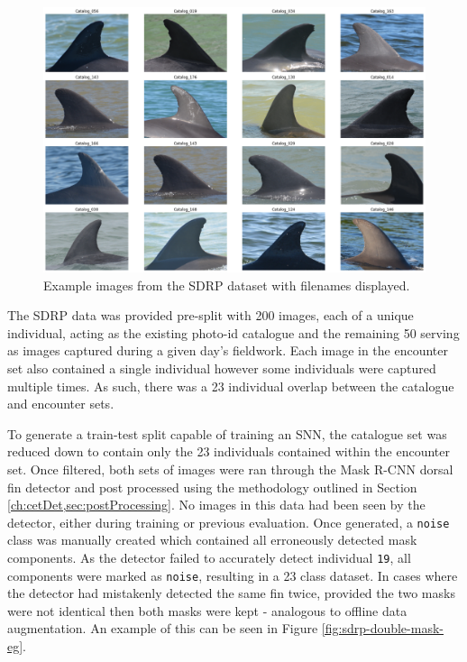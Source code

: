 \begin{figure}
	\begin{center}
		\includegraphics[scale=0.3]{Chapter6/figs/SDRP_egs_tiled.png}
	\end{center}
	\caption{Example images from the SDRP dataset with filenames displayed.}
	\label{fig:sdrp-example}
\end{figure}

The SDRP data was provided pre-split with 200 images, each of a unique individual, acting as the existing photo-id catalogue and the remaining 50 serving as images captured during a given day's fieldwork. Each image in the encounter set also contained a single individual however some individuals were captured multiple times. As such, there was a 23 individual overlap between the catalogue and encounter sets. 

To generate a train-test split capable of training an SNN, the catalogue set was reduced down to contain only the 23 individuals contained within the encounter set. Once filtered, both sets of images were ran through the Mask R-CNN dorsal fin detector and post processed using the methodology outlined in Section \ref{ch:cetDet,sec:postProcessing}. No images in this data had been seen by the detector, either during training or previous evaluation. Once generated, a \texttt{noise} class was manually created which contained all erroneously detected mask components. As the detector failed to accurately detect individual \texttt{19}, all components were marked as \texttt{noise}, resulting in a 23 class dataset. In cases where the detector had mistakenly detected the same fin twice, provided the two masks were not identical then both masks were kept - analogous to offline data augmentation. An example of this can be seen in Figure \ref{fig:sdrp-double-mask-eg}.

